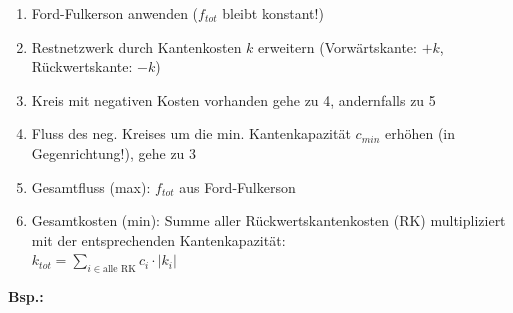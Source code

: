 \begin{enumerate}
	\item Ford-Fulkerson anwenden ($f_{tot}$ bleibt konstant!)
	\item Restnetzwerk durch Kantenkosten $k$ erweitern (Vorwärtskante: $+k$, Rückwertskante: $-k$)
	\item Kreis mit negativen Kosten vorhanden gehe zu 4, andernfalls zu 5
	\item Fluss des neg. Kreises um die min. Kantenkapazität $c_{min}$ erhöhen (in Gegenrichtung!), gehe zu 3
	\item Gesamtfluss (max): $f_{tot}$ aus Ford-Fulkerson
	\item Gesamtkosten (min): Summe aller Rückwertskantenkosten (RK) multipliziert mit der entsprechenden Kantenkapazität:\\  
	$k_{tot} = \sum\limits_{ i \in \text{alle RK}} c_i \cdot |k_i| $
\end{enumerate}

\textbf{Bsp.:}

